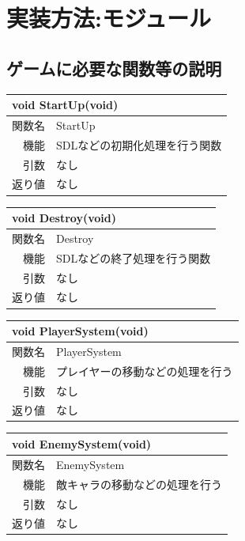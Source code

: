 \documentclass{jarticle}
\begin{document}
\section{実装方法:モジュール}
\subsection{ゲームに必要な関数等の説明}

\begin{table}[H]
\begin{tabular}{|r|l|}
\hline
\multicolumn{2}{|l|}{void StartUp(void)}       \\ \hline
関数名           & StartUp \\ \hline
機能     & SDLなどの初期化処理を行う関数  \\
引数 	 	 & なし \\ 
返り値	 & なし \\ \hline
\end{tabular}
\end{table}


\begin{table}[H]
\begin{tabular}{|r|l|}
\hline
\multicolumn{2}{|l|}{void Destroy(void)}       \\ \hline
関数名           & Destroy \\ \hline
機能     & SDLなどの終了処理を行う関数  \\
引数 	 	 & なし \\ 
返り値	 & なし \\ \hline
\end{tabular}
\end{table}


\begin{table}[H]
\begin{tabular}{|r|l|}
\hline
\multicolumn{2}{|l|}{void PlayerSystem(void)}       \\ \hline
関数名           & PlayerSystem\\ \hline
機能     &  プレイヤーの移動などの処理を行う  \\
引数 	 	 & なし \\ 
返り値	 & なし \\ \hline
\end{tabular}
\end{table}


\begin{table}[H]
\begin{tabular}{|r|l|}
\hline
\multicolumn{2}{|l|}{void EnemySystem(void)}       \\ \hline
関数名           &  EnemySystem \\ \hline
機能     & 敵キャラの移動などの処理を行う  \\
引数 	 	 & なし \\ 
返り値	 & なし \\ \hline
\end{tabular}
\end{table}
\end{document}
